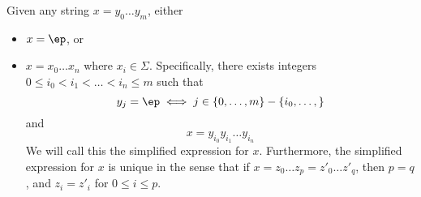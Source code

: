 Given any string $x = y_0\ldots y_m$, either
\begin{itemize}
 \item $x = \ep$, or
 \item $x = x_0 \ldots x_n$ where $x_i \in \Sigma$. Specifically,
       there exists integers $0 \leq i_0 < i_1 < \ldots < i_n \leq m$ such that
       \[
        y_j =
        \ep \iff j \in \{0,\ldots,m\} - \{i_0, \ldots, \}
       \]
      and
      \[
       x = y_{i_0} y_{i_1} \ldots y_{i_n}
      \]
      We will call this the simplified expression for $x$. Furthermore,
      the simplified expression for $x$ is unique in the sense that if $x
      = z_0 \ldots z_p = z'_0 \ldots z'_q$, then $p=q$, and $z_i = z'_i$
      for $0\leq i \leq p$.
\end{itemize}
